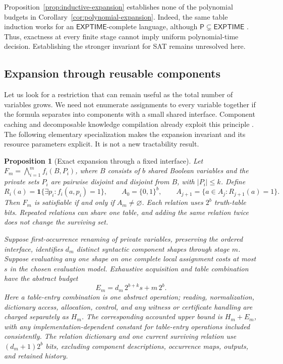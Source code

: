 \documentclass[11pt,a4paper]{article}
\numberwithin{equation}{section}
\newcommand{\Pclass}{\mathsf{P}}
\newcommand{\bits}{\{0,1\}}
\newcommand{\ind}{\mathbf{1}}
\theoremstyle{plain}
\newtheorem{proposition}[lemma]{Proposition}
\theoremstyle{definition}
\theoremstyle{remark}
\begin{document}
Proposition~\ref{prop:inductive-expansion} establishes none of the polynomial budgets in Corollary~\ref{cor:polynomial-expansion}. Indeed, the same table induction works for an $\mathsf{EXPTIME}$-complete language, although $\Pclass\subsetneq\mathsf{EXPTIME}$ \citep{sipser2020theory}. Thus, exactness at every finite stage cannot imply uniform polynomial-time decision. Establishing the stronger invariant for SAT remains unresolved here.

\subsection{Expansion through reusable components}
\label{sec:structural-expansion}

Let us look for a restriction that can remain useful as the total number of variables grows. We need not enumerate assignments to every variable together if the formula separates into components with a small shared interface. Component caching and decomposable knowledge compilation already exploit this principle \citep{sang2004components,bacchus2009backtracking,darwiche2002}. The following elementary specialization makes the expansion invariant and its resource parameters explicit. It is not a new tractability result.

\begin{proposition}[Exact expansion through a fixed interface]
\label{prop:component-expansion}
Let $F_m=\bigwedge_{i=1}^m f_i(B,P_i)$, where $B$ consists of $b$ shared Boolean variables and the private sets $P_i$ are pairwise disjoint and disjoint from $B$, with $|P_i|\leq k$. Define
\begin{equation}
R_i(a)=\ind\{\exists p_i\colon f_i(a,p_i)=1\},\qquad
A_0=\bits^b,\qquad A_{j+1}=\{a\in A_j:R_{j+1}(a)=1\}.
\label{eq:interface-expansion}
\end{equation}
Then $F_m$ is satisfiable if and only if $A_m\neq\varnothing$. Each relation uses $2^b$ truth-table bits. Repeated relations can share one table, and adding the same relation twice does not change the surviving set.

Suppose first-occurrence renaming of private variables, preserving the ordered interface, identifies $d_m$ distinct syntactic component shapes through stage $m$. Suppose evaluating any one shape on one complete local assignment costs at most $s$ in the chosen evaluation model. Exhaustive acquisition and table combination have the abstract budget
\begin{equation}
E_m=d_m\,2^{b+k}s+m\,2^b.
\label{eq:component-budget}
\end{equation}
Here a table-entry combination is one abstract operation; reading, normalization, dictionary access, allocation, control, and any witness or certificate handling are charged separately as $H_m$. The corresponding accounted upper bound is $H_m+E_m$, with any implementation-dependent constant for table-entry operations included consistently. The relation dictionary and one current surviving relation use $(d_m+1)2^b$ bits, excluding component descriptions, occurrence maps, outputs, and retained history.
\end{proposition}
\end{document}
